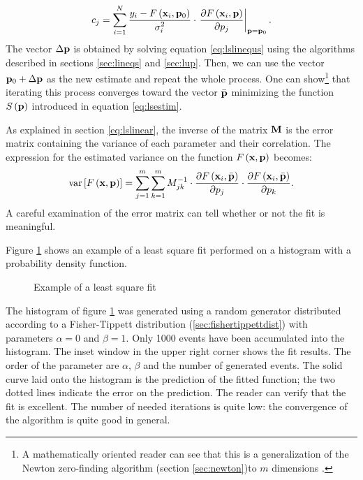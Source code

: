 \documentclass[twoside]{book}
\begin{document}
\begin{equation}
\label{eq:lsvector}
  c_j=\sum_{i=1}^N {\displaystyle
  y_i-F\left({\bf x}_i,{\bf
p}_0\right)\over\displaystyle\sigma_i^2}\cdot\left.{\displaystyle\partial
F\left({\bf x}_i,{\bf p}\right)\over\displaystyle\partial
p_j}\right|_{{\bf p}={\bf p}_0}.
\end{equation}
The vector $\Delta{\bf p}$ is obtained by solving equation
\ref{eq:lslinequs} using the algorithms described in sections
\ref{sec:lineqs} and \ref{sec:lup}. Then, we can use the vector
${\bf p}_0+\Delta{\bf p}$ as the new estimate and repeat the whole
process. One can show\footnote{A mathematically oriented reader
can see that this is a generalization of the Newton zero-finding
algorithm (\cf section \ref{sec:newton})to $m$ dimensions .} that
iterating this process converges toward the vector $\bar{\bf p}$
minimizing the function $S\left({\bf p}\right)$ introduced in
equation \ref{eq:lsestim}.

As explained in section \ref{eq:lslinear}, the inverse of the
matrix ${\bf M}$ is the error matrix containing the variance of
each parameter and their correlation. The expression for the
estimated variance on the function $F\left({\bf x},{\bf p}\right)$
becomes:
\begin{equation}
\label{eq:nllserror}
  \mathop{\rm var}\left[F\left({\bf x},{\bf p}\right)\right]=
  \sum_{j=1}^m\sum_{k=1}^m M_{jk}^{-1}\cdot
  {\displaystyle\partial F\left({\bf x}_i,\bar{\bf
p}\right)\over\displaystyle\partial
p_j}\cdot{\displaystyle\partial F\left({\bf x}_i,\bar{\bf
p}\right)\over\displaystyle\partial p_k}.
\end{equation}
A careful examination of the error matrix can tell whether or not
the fit is meaningful.

Figure \ref{fig:lsfExample} shows an example of a least square fit
performed on a histogram with a probability density function.
\begin{figure}
\center{}
\caption{Example of a least square fit}\label{fig:lsfExample}
\end{figure}
The histogram of figure \ref{fig:lsfExample} was generated using a
random generator distributed according to a Fisher-Tippett
distribution (\cf \ref{sec:fishertippettdist}) with parameters
$\alpha = 0$ and $\beta=1$. Only 1000 events have been accumulated
into the histogram. The inset window in the upper right corner
shows the fit results. The order of the parameter are $\alpha$,
$\beta$ and the number of generated events. The solid curve laid
onto the histogram is the prediction of the fitted function; the
two dotted lines indicate the error on the prediction. The reader
can verify that the fit is excellent. The number of needed
iterations is quite low: the convergence of the algorithm is quite
good in general.
\end{document}
